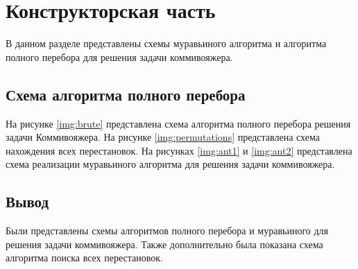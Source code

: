 \chapter{Конструкторская часть}

В данном разделе представлены схемы муравьиного алгоритма и алгоритма полного перебора для решения задачи коммивояжера.

\section{Схема алгоритма полного перебора}

На рисунке \ref{img:brute} представлена схема алгоритма полного перебора решения задачи Коммивояжера. На рисунке \ref{img:permutations} представлена схема нахождения всех перестановок. На рисунках \ref{img:ant1} и \ref{img:ant2} представлена схема реализации муравьиного алгоритма для решения задачи коммивояжера.

\clearpage
{}
\clearpage
{}
\clearpage
{}
\clearpage
{}
\clearpage

\section*{Вывод}
Были представлены схемы алгоритмов полного перебора и муравьиного для решения задачи коммивояжера. Также дополнительно была показана схема алгоритма поиска всех перестановок.

